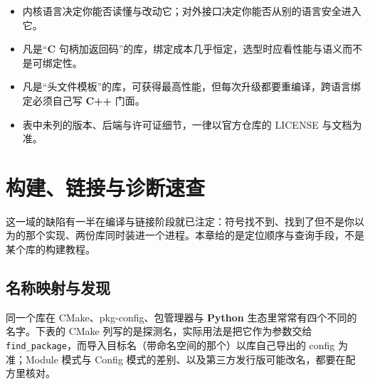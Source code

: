 \documentclass[12pt,a4paper,fontset=fandol]{ctexbook}
\newcommand{\Tp}[1]{\texttt{#1}}
\newcommand{\Lang}[1]{\textsf{\bfseries #1}}
\newcommand{\CL}{\Lang{C}}
\newcommand{\CPP}{\Lang{C++}}
\newcommand{\PY}{\Lang{Python}}
\begin{document}
\begin{guideline}[title={怎么读这三张矩阵}]
\begin{itemize}
\item 内核语言决定你能否读懂与改动它；对外接口决定你能否从别的语言安全进入它。
\item 凡是``\CL{} 句柄加返回码''的库，绑定成本几乎恒定，选型时应看性能与语义而不是可绑定性。
\item 凡是``头文件模板''的库，可获得最高性能，但每次升级都要重编译，跨语言绑定必须自己写 \CPP{} 门面。
\item 表中未列的版本、后端与许可证细节，一律以官方仓库的 LICENSE 与文档为准。
\end{itemize}
\end{guideline}

\chapter{构建、链接与诊断速查}

这一域的缺陷有一半在编译与链接阶段就已注定：符号找不到、找到了但不是你以为的那个实现、两份库同时装进一个进程。本章给的是定位顺序与查询手段，不是某个库的构建教程。

\section{名称映射与发现}

同一个库在 CMake、pkg-config、包管理器与 \PY{} 生态里常常有四个不同的名字。下表的 CMake 列写的是探测名，实际用法是把它作为参数交给 \Tp{find\_package}，而导入目标名（带命名空间的那个）以库自己导出的 config 为准；Module 模式与 Config 模式的差别、以及第三方发行版可能改名，都要在配方里核对。
\end{document}
